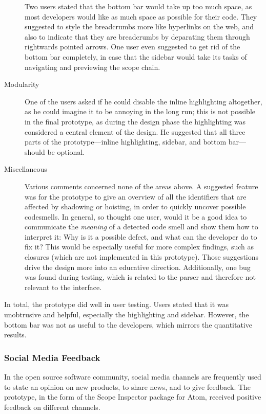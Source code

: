 \begin{description}
Two users stated that the bottom bar would take up too much space, as
most developers would like as much space as possible for their code.
They suggested to style the breadcrumbs more like hyperlinks on the web,
and also to indicate that they are breadcrumbs by deparating them
through rightwards pointed arrows. One user even suggested to get rid of
the bottom bar completely, in case that the sidebar would take its tasks
of navigating and previewing the scope chain.
\item[Modularity]
One of the users asked if he could disable the inline highlighting
altogether, as he could imagine it to be annoying in the long run; this
is not possible in the final prototype, as during the design phase the
highlighting was considered a central element of the design. He
suggested that all three parts of the prototype—inline highlighting,
sidebar, and bottom bar—should be optional.
\item[Miscellaneous]
Various comments concerned none of the areas above. A suggested feature
was for the prototype to give an overview of all the identifiers that
are affected by shadowing or hoisting, in order to quickly uncover
possible \glspl{codesmell}. In general, so thought one user, would it be
a good idea to communicate the \emph{meaning} of a detected code smell
and show them how to interpret it: Why is it a possible defect, and what
can the developer do to fix it? This would be especially useful for more
complex findings, such as closures (which are not implemented in this
prototype). Those suggestions drive the design more into an educative
direction. Additionally, one bug was found during testing, which is
related to the parser and therefore not relevant to the interface.
\end{description}

In total, the prototype did well in user testing. Users stated that it
was unobtrusive and helpful, especially the highlighting and sidebar.
However, the bottom bar was not as useful to the developers, which
mirrors the quantitative results.

\subsubsection{Social Media Feedback}\label{social-media-feedback}

In the open source software community, social media channels are
frequently used to state an opinion on new products, to share news, and
to give feedback. The prototype, in the form of the Scope Inspector
package for Atom, received positive feedback on different channels.

